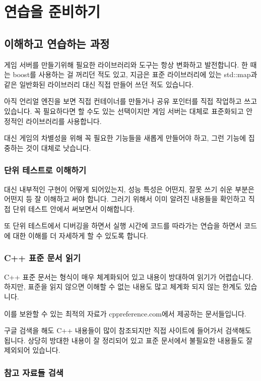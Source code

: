\chapter{연습을 준비하기}

\section{이해하고 연습하는 과정}

게임 서버를 만들기위해 필요한 라이브러리와 도구는 항상 변화하고 발전합니다. 한 때는 
boost를 사용하는 걸 꺼리던 적도 있고, 지금은 표준 라이브러리에 있는 std::map과 같은 
일반화된 라이브러리 대신 직접 만들어 쓰던 적도 있습니다. 

아직 언리얼 엔진을 보면 직접 컨테이너를 만들거나 공유 포인터를 직접 작업하고 쓰고 
있습니다. 꼭 필요하다면 할 수도 있는 선택이지만 게임 서버는 대체로 표준화되고 
안정적인 라이브러리를 사용합니다. 

대신 게임의 차별성을 위해 꼭 필요한 기능들을 새롭게 만들어야 하고, 그런 기능에 
집중하는 것이 대체로 낫습니다. 

\subsection{단위 테스트로 이해하기}

대신 내부적인 구현이 어떻게 되어있는지, 성능 특성은 어떤지, 잘못 쓰기 쉬운 부분은 
어떤지 등 잘 이해하고 써야 합니다. 그러기 위해서 이미 알려진 내용들을 확인하고 
직접 단위 테스트 안에서 써보면서 이해합니다. 

또 단위 테스트에서 디버깅을 하면서 실행 시간에 코드를 따라가는 연습을 하면서 
코드에 대한 이해를 더 자세하게 할 수 있도록 합니다. 

\subsection{C++ 표준 문서 읽기}

C++ 표준 문서는 형식이 매우 체계화되어 있고 내용이 방대하여 읽기가 어렵습니다. 
하지만, 표준을 읽지 않으면 이해할 수 없는 내용도 많고 체계화 되지 않는 한계도 
있습니다. 

이를 보완할 수 있는 최적의 자료가 cppreference.com에서 제공하는 문서들입니다. 

구글 검색을 해도 C++ 내용들이 많이 참조되지만 직접 사이트에 들어가서 검색해도 
됩니다. 상당히 방대한 내용이 잘 정리되어 있고 표준 문서에서 불필요한 내용들도 
잘 제외되어 있습니다. 

\subsection{참고 자료들 검색}

